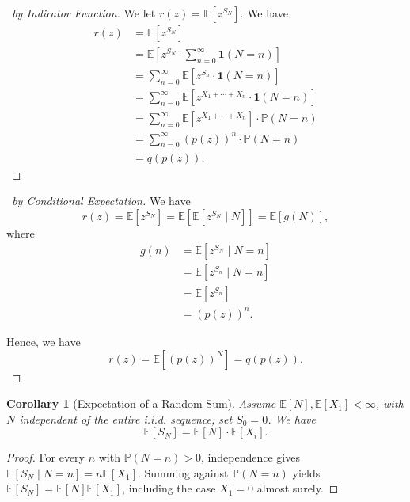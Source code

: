 \documentclass[11pt]{article}
\numberwithin{equation}{section}
\newtheorem{corollary}[theorem]{Corollary}
\theoremstyle{definition}
\theoremstyle{remark}
\newcommand{\pqty}[1]{\left(#1\right)}
\newcommand{\bqty}[1]{\left[#1\right]}
\newcommand{\indicator}{\mathbf 1}
\newcommand{\Prob}{\mathbb P}
\newcommand{\Expt}{\mathbb E}
\newcommand{\Conditional}[2]{#1\mid #2}
\begin{document}
\begin{proof}[\proofname\ by Indicator Function]\label{probability-proof-043}
    We let \(r\pqty{z} = \Expt\bqty{z^{S_N}}\). We have
    \begin{align*}
        r\pqty{z} &= \Expt\bqty{z^{S_N}} \\
        &= \Expt\bqty{z^{S_N} \cdot \sum_{n = 0}^{\infty}  \indicator\pqty{N = n}} \\
        &= \sum_{n = 0}^{\infty} \Expt\bqty{z^{S_n} \cdot \indicator \pqty{N = n}} \\
        &= \sum_{n = 0}^{\infty} \Expt\bqty{z^{X_1 + \cdots + X_n} \cdot \indicator\pqty{N = n}} \\
        &= \sum_{n = 0}^{\infty} \Expt\bqty{z^{X_1 + \cdots + X_n}} \cdot \Prob\pqty{N = n} \\
        &= \sum_{n = 0}^{\infty} \pqty{p\pqty{z}}^{n} \cdot \Prob\pqty{N = n} \\
        &= q\pqty{p\pqty{z}}.
    \end{align*}
\end{proof}

\begin{proof}[\proofname\ by Conditional Expectation]\label{probability-proof-044}
    We have
    \[
        r\pqty{z} = \Expt\bqty{z^{S_N}} = \Expt\bqty{\Expt\bqty{\Conditional{z^{S_N}}{N}}} = \Expt\bqty{g\pqty{N}},
    \]
    where
    \begin{align*}
        g\pqty{n} &= \Expt\bqty{\Conditional{z^{S_N}}{N=n}} \\
        &= \Expt\bqty{\Conditional{z^{S_n}}{N = n}} \\
        &= \Expt\bqty{z^{S_n}} \\
        &= \pqty{p\pqty{z}}^{n}.
    \end{align*}

    Hence, we have
    \[
        r\pqty{z} = \Expt\bqty{\pqty{p\pqty{z}}^{N}} = q\pqty{p\pqty{z}}.
    \]
\end{proof}

\begin{corollary}[Expectation of a Random Sum]\label{probability-corollary-008}
    \label{probability-cor:expt-random-sum}%
Assume \(\Expt[N],\Expt[X_1]<\infty\), with \(N\) independent of the entire i.i.d. sequence; set \(S_0=0\).
    We have
    \[
        \Expt\bqty{S_N} = \Expt\bqty{N} \cdot \Expt\bqty{X_i}.
    \]
\end{corollary}

\begin{proof}\label{probability-proof-045}
For every \(n\) with \(\Prob(N=n)>0\), independence gives
\(\Expt[S_N\mid N=n]=n\Expt[X_1]\). Summing against \(\Prob(N=n)\)
yields \(\Expt[S_N]=\Expt[N]\Expt[X_1]\), including the case \(X_1=0\) almost surely.
\end{proof}
\end{document}

